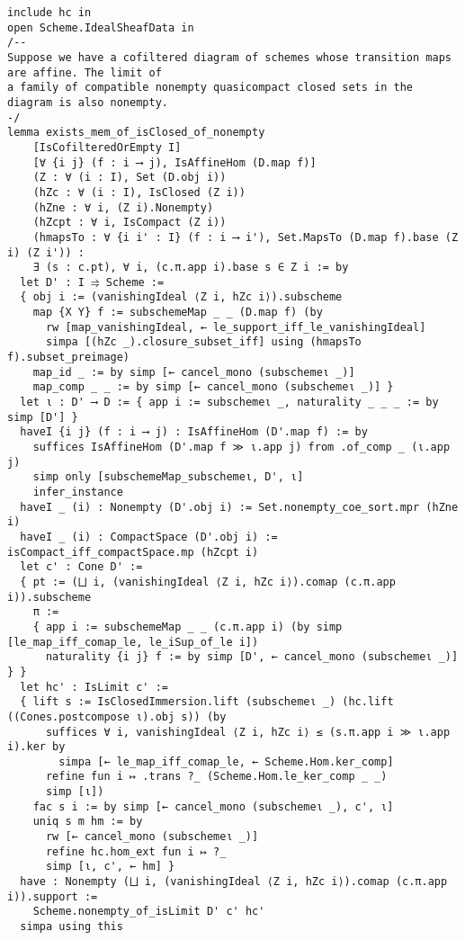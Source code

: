 \documentclass{article}
\begin{document}
\begin{lstlisting}[language=Lean, caption={AffineTransitionLimit.lean}]
include hc in
open Scheme.IdealSheafData in
/--
Suppose we have a cofiltered diagram of schemes whose transition maps are affine. The limit of
a family of compatible nonempty quasicompact closed sets in the diagram is also nonempty.
-/
lemma exists_mem_of_isClosed_of_nonempty
    [IsCofilteredOrEmpty I]
    [∀ {i j} (f : i ⟶ j), IsAffineHom (D.map f)]
    (Z : ∀ (i : I), Set (D.obj i))
    (hZc : ∀ (i : I), IsClosed (Z i))
    (hZne : ∀ i, (Z i).Nonempty)
    (hZcpt : ∀ i, IsCompact (Z i))
    (hmapsTo : ∀ {i i' : I} (f : i ⟶ i'), Set.MapsTo (D.map f).base (Z i) (Z i')) :
    ∃ (s : c.pt), ∀ i, (c.π.app i).base s ∈ Z i := by
  let D' : I ⥤ Scheme :=
  { obj i := (vanishingIdeal ⟨Z i, hZc i⟩).subscheme
    map {X Y} f := subschemeMap _ _ (D.map f) (by
      rw [map_vanishingIdeal, ← le_support_iff_le_vanishingIdeal]
      simpa [(hZc _).closure_subset_iff] using (hmapsTo f).subset_preimage)
    map_id _ := by simp [← cancel_mono (subschemeι _)]
    map_comp _ _ := by simp [← cancel_mono (subschemeι _)] }
  let ι : D' ⟶ D := { app i := subschemeι _, naturality _ _ _ := by simp [D'] }
  haveI {i j} (f : i ⟶ j) : IsAffineHom (D'.map f) := by
    suffices IsAffineHom (D'.map f ≫ ι.app j) from .of_comp _ (ι.app j)
    simp only [subschemeMap_subschemeι, D', ι]
    infer_instance
  haveI _ (i) : Nonempty (D'.obj i) := Set.nonempty_coe_sort.mpr (hZne i)
  haveI _ (i) : CompactSpace (D'.obj i) := isCompact_iff_compactSpace.mp (hZcpt i)
  let c' : Cone D' :=
  { pt := (⨆ i, (vanishingIdeal ⟨Z i, hZc i⟩).comap (c.π.app i)).subscheme
    π :=
    { app i := subschemeMap _ _ (c.π.app i) (by simp [le_map_iff_comap_le, le_iSup_of_le i])
      naturality {i j} f := by simp [D', ← cancel_mono (subschemeι _)] } }
  let hc' : IsLimit c' :=
  { lift s := IsClosedImmersion.lift (subschemeι _) (hc.lift ((Cones.postcompose ι).obj s)) (by
      suffices ∀ i, vanishingIdeal ⟨Z i, hZc i⟩ ≤ (s.π.app i ≫ ι.app i).ker by
        simpa [← le_map_iff_comap_le, ← Scheme.Hom.ker_comp]
      refine fun i ↦ .trans ?_ (Scheme.Hom.le_ker_comp _ _)
      simp [ι])
    fac s i := by simp [← cancel_mono (subschemeι _), c', ι]
    uniq s m hm := by
      rw [← cancel_mono (subschemeι _)]
      refine hc.hom_ext fun i ↦ ?_
      simp [ι, c', ← hm] }
  have : Nonempty (⨆ i, (vanishingIdeal ⟨Z i, hZc i⟩).comap (c.π.app i)).support :=
    Scheme.nonempty_of_isLimit D' c' hc'
  simpa using this


\end{lstlisting}
\end{document}
